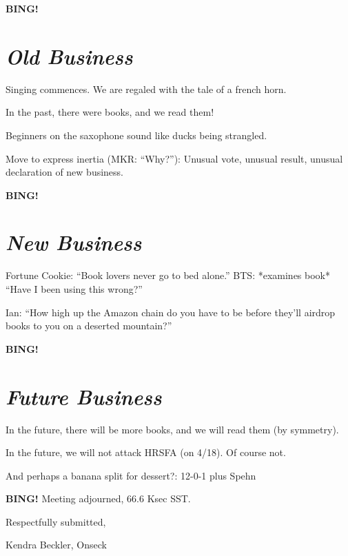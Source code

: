 \documentclass[10pt]{article}
\newcommand{\bing}{{\bf BING!} }
\newcommand{\goto}[1]{\bing \vskip 12pt \section*{{\em{#1}}}}
\newcommand{\ps}{ plus Spehn\xspace}
\newcommand{\onseck}{Kendra Beckler, Onseck}
\begin{document}
\goto{Old Business}

Singing commences.  We are regaled with the tale of a french horn.

In the past, there were books, and we read them!

Beginners on the saxophone sound like ducks being strangled.

Move to express inertia (MKR: ``Why?''): Unusual vote, unusual result, unusual declaration of new business.

\goto{New Business}

Fortune Cookie: ``Book lovers never go to bed alone.''
BTS: *examines book* ``Have I been using this wrong?''

Ian: ``How high up the Amazon chain do you have to be before they'll airdrop books to you on a deserted mountain?''

\goto{Future Business}

In the future, there will be more books, and we will read them (by symmetry).

In the future, we will not attack HRSFA (on 4/18).  Of course not.

And perhaps a banana split for dessert?: 12-0-1 \ps

\bing
\noindent
Meeting adjourned, 66.6 Ksec SST.

\vspace{18pt}

\centerline{Respectfully submitted,}
\centerline{\onseck}
\end{document}
